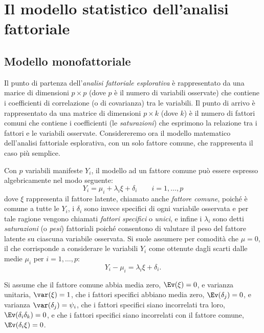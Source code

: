 
\chapter{Il modello statistico dell'analisi fattoriale}
\label{ch:mod_unifattoriale}

\section{Modello monofattoriale}

Il punto di partenza dell'\textit{analisi fattoriale esplorativa}
è rappresentato da una marice  di dimensioni $p \times p$ (dove $p$ è il numero di variabili osservate) che contiene i coefficienti di correlazione (o di covarianza) tra le variabili.
 Il punto di arrivo è rappresentato da una matrice di dimensioni $p \times k$ (dove $k$) è il numero di fattori comuni che contiene i coefficienti (le \textit{saturazioni}) che esprimono la relazione tra i fattori e le variabili osservate. 
 Considereremo ora il modello matematico dell'analisi fattoriale esplorativa, con un solo fattore comune, che rappresenta il  caso più semplice. 
 
Con $p$ variabili manifeste $Y_i$, il modello ad un fattore
comune pu{\`o} essere espresso algebricamente nel modo seguente:
\[
  Y_i = \mu_i + \lambda_{i} \xi + \delta_i \qquad i=1, \dots, p
\]
dove $\xi$ rappresenta il fattore latente, chiamato anche
\textit{fattore comune}, poiché è comune a tutte le $Y_i$,  i
$\delta_i$ sono invece specifici di ogni variabile osservata e per
tale ragione vengono chiamati \textit{fattori specifici} o \textit{unici}, e infine i
$\lambda_i$ sono detti \textit{saturazioni} (o \textit{pesi}) fattoriali
poiché consentono di valutare il peso del fattore latente su ciascuna
variabile osservata.
 Si suole assumere per comodità che $\mu=0$, il che corrisponde a considerare le variabili $Y_i$ come ottenute dagli scarti dalle medie $\mu_i$ per $i = 1, \dots, p$:
\[
  Y_i -\mu_i = \lambda_i \xi + \delta_i.
\]

Si  assume che 
il fattore comune abbia media zero, $\Ev(\xi)=0$, e 
varianza unitaria, $\var(\xi)=1$, 
 che i fattori specifici
abbiano media zero, $\Ev(\delta_j)=0$, e varianza
$\var(\delta_j)=\psi_{i}$,
che i fattori specifici siano incorrelati tra loro, $\Ev
  (\delta_i \delta_k)=0$, e che
 i fattori specifici siano incorrelati con il fattore comune, $\Ev(\delta_i \xi)=0$. 
  
